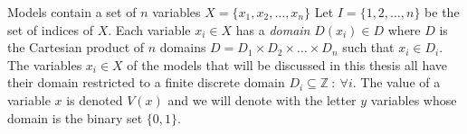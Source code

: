Models contain a set of $n$ variables $X = \{ x_1, x_2, \dots , x_n \} $ Let $I = \{1,2,\dots , n\}$ be the set of 
indices of $X$. Each variable $x_i \in X$ has a \emph{domain} $D(x_i) \in D$ where $D$ is the Cartesian product of $n$ 
domains $D =  D_1 \times D_2 \times \dots\times D_n $ such that $x_i \in D_i$. The variables $x_i \in X$ of the models 
that will be discussed in this thesis all have their domain restricted to a finite discrete domain $D_i \subseteq 
\mathbb{Z}\ : \: \forall i$. The value of a variable $x$ is denoted $V(x)$ and 
we will denote with the letter $y$ variables whose domain is the binary set $\{0,1\}$. 
